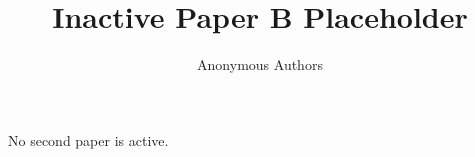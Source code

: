 \documentclass{article}
\title{Inactive Paper B Placeholder}
\author{Anonymous Authors}
\begin{document}
\maketitle
No second paper is active.
\end{document}
